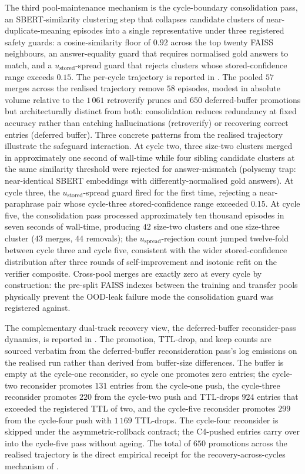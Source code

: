The third pool-maintenance mechanism is the cycle-boundary consolidation pass, an SBERT-similarity clustering step that collapses candidate clusters of near-duplicate-meaning episodes into a single representative under three registered safety guards: a cosine-similarity floor of $0.92$ across the top twenty FAISS neighbours, an answer-equality guard that requires normalised gold answers to match, and a $u_{\text{stored}}$-spread guard that rejects clusters whose stored-confidence range exceeds $0.15$. The per-cycle trajectory is reported in . The pooled $57$ merges across the realised trajectory remove $58$ episodes, modest in absolute volume relative to the $1\,061$ retroverify prunes and $650$ deferred-buffer promotions but architecturally distinct from both: consolidation reduces redundancy at fixed accuracy rather than catching hallucinations (retroverify) or recovering correct entries (deferred buffer). Three concrete patterns from the realised trajectory illustrate the safeguard interaction. At cycle two, three size-two clusters merged in approximately one second of wall-time while four sibling candidate clusters at the same similarity threshold were rejected for answer-mismatch (polysemy trap: near-identical SBERT embeddings with differently-normalised gold answers). At cycle three, the $u_{\text{stored}}$-spread guard fired for the first time, rejecting a near-paraphrase pair whose cycle-three stored-confidence range exceeded $0.15$. At cycle five, the consolidation pass processed approximately ten thousand episodes in seven seconds of wall-time, producing $42$ size-two clusters and one size-three cluster ($43$ merges, $44$ removals); the $u_{\text{spread}}$-rejection count jumped twelve-fold between cycle three and cycle five, consistent with the wider stored-confidence distribution after three rounds of self-improvement and isotonic refit on the verifier composite. Cross-pool merges are exactly zero at every cycle by construction: the pre-split FAISS indexes between the training and transfer pools physically prevent the OOD-leak failure mode the consolidation guard was registered against.



The complementary dual-track recovery view, the deferred-buffer reconsider-pass dynamics, is reported in . The promotion, TTL-drop, and keep counts are sourced verbatim from the deferred-buffer reconsideration pass's log emissions on the realised run rather than derived from buffer-size differences. The buffer is empty at the cycle-one reconsider, so cycle one promotes zero entries; the cycle-two reconsider promotes $131$ entries from the cycle-one push, the cycle-three reconsider promotes $220$ from the cycle-two push and TTL-drops $924$ entries that exceeded the registered TTL of two, and the cycle-five reconsider promotes $299$ from the cycle-four push with $1\,169$ TTL-drops. The cycle-four reconsider is skipped under the asymmetric-rollback contract; the C4-pushed entries carry over into the cycle-five pass without ageing. The total of $650$ promotions across the realised trajectory is the direct empirical receipt for the recovery-across-cycles mechanism of .

